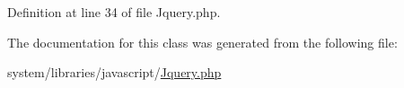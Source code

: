 Definition at line 34 of file Jquery.\-php.



The documentation for this class was generated from the following file\-:\begin{DoxyCompactItemize}
\item 
system/libraries/javascript/\hyperlink{_jquery_8php}{Jquery.\-php}\end{DoxyCompactItemize}

